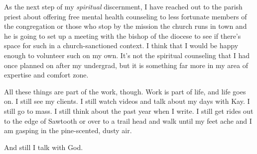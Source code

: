 As the next step of my \emph{spiritual} discernment, I have reached out to the parish priest about offering free mental health counseling to less fortunate members of the congregation or those who stop by the mission the church runs in town and he is going to set up a meeting with the bishop of the diocese to see if there's space for such in a church-sanctioned context. I think that I would be happy enough to volunteer such on my own. It's not the spiritual counseling that I had once planned on after my undergrad, but it is something far more in my area of expertise and comfort zone.

All these things are part of the work, though. Work is part of life, and life goes on. I still see my clients. I still watch videos and talk about my days with Kay. I still go to mass. I still think about the past year when I write. I still get rides out to the edge of Sawtooth or over to a trail head and walk until my feet ache and I am gasping in the pine-scented, dusty air.

And still I talk with God.
